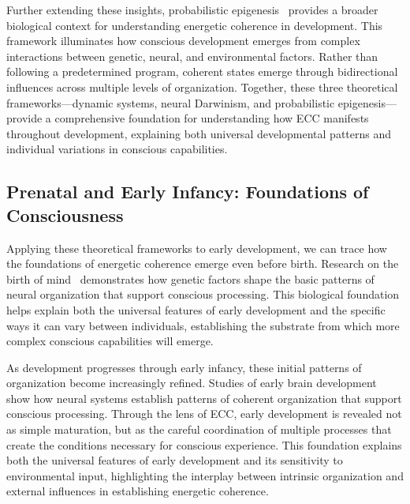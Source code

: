 Further extending these insights, probabilistic epigenesis~\cite{Gottlieb2007, da2024mathematical} provides a broader biological context for understanding energetic coherence in development. This framework illuminates how conscious development emerges from complex interactions between genetic, neural, and environmental factors. Rather than following a predetermined program, coherent states emerge through bidirectional influences across multiple levels of organization. Together, these three theoretical frameworks—dynamic systems, neural Darwinism, and probabilistic epigenesis—provide a comprehensive foundation for understanding how ECC manifests throughout development, explaining both universal developmental patterns and individual variations in conscious capabilities.

\subsection*{Prenatal and Early Infancy: Foundations of Consciousness}

Applying these theoretical frameworks to early development, we can trace how the foundations of energetic coherence emerge even before birth. Research on the birth of mind~\cite{Marcus2004, hunt2024electromagnetic} demonstrates how genetic factors shape the basic patterns of neural organization that support conscious processing. This biological foundation helps explain both the universal features of early development and the specific ways it can vary between individuals, establishing the substrate from which more complex conscious capabilities will emerge.

As development progresses through early infancy, these initial patterns of organization become increasingly refined. Studies of early brain development~\cite{DehaeneLambertz2015, kukushkin2024massed} show how neural systems establish patterns of coherent organization that support conscious processing. Through the lens of ECC, early development is revealed not as simple maturation, but as the careful coordination of multiple processes that create the conditions necessary for conscious experience. This foundation explains both the universal features of early development and its sensitivity to environmental input, highlighting the interplay between intrinsic organization and external influences in establishing energetic coherence.


